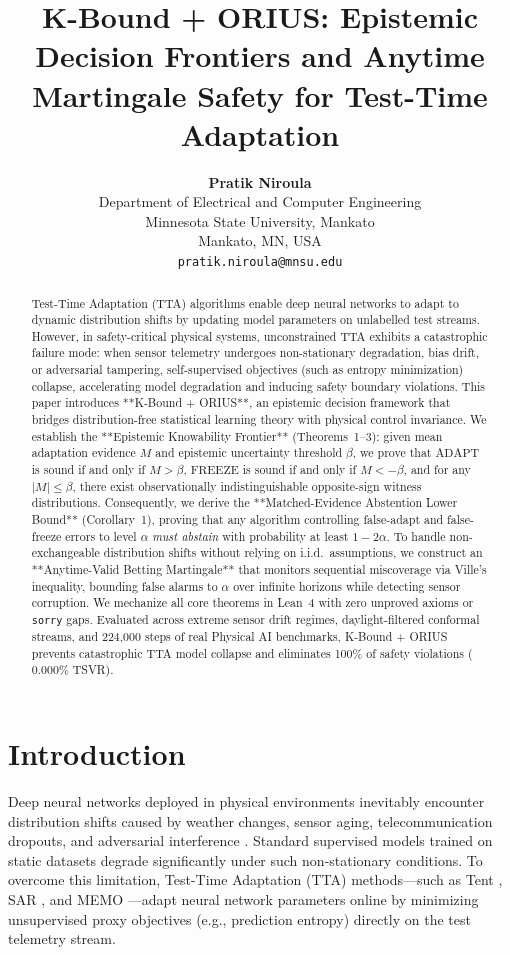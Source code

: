 \documentclass[10pt]{article}
\title{\textbf{K-Bound + ORIUS: Epistemic Decision Frontiers and Anytime Martingale Safety for Test-Time Adaptation}}
\author{
  \textbf{Pratik Niroula} \\
  Department of Electrical and Computer Engineering \\
  Minnesota State University, Mankato \\
  Mankato, MN, USA \\
  \texttt{pratik.niroula@mnsu.edu}
}
\date{}
\begin{document}
\maketitle

\begin{abstract}
Test-Time Adaptation (TTA) algorithms enable deep neural networks to adapt to dynamic distribution shifts by updating model parameters on unlabelled test streams. However, in safety-critical physical systems, unconstrained TTA exhibits a catastrophic failure mode: when sensor telemetry undergoes non-stationary degradation, bias drift, or adversarial tampering, self-supervised objectives (such as entropy minimization) collapse, accelerating model degradation and inducing safety boundary violations.
This paper introduces **K-Bound + ORIUS**, an epistemic decision framework that bridges distribution-free statistical learning theory with physical control invariance. We establish the **Epistemic Knowability Frontier** (Theorems~1--3): given mean adaptation evidence $M$ and epistemic uncertainty threshold $\beta$, we prove that $\mathrm{ADAPT}$ is sound if and only if $M > \beta$, $\mathrm{FREEZE}$ is sound if and only if $M < -\beta$, and for any $|M| \le \beta$, there exist observationally indistinguishable opposite-sign witness distributions. Consequently, we derive the **Matched-Evidence Abstention Lower Bound** (Corollary~1), proving that any algorithm controlling false-adapt and false-freeze errors to level $\alpha$ \emph{must abstain} with probability at least $1 - 2\alpha$.
To handle non-exchangeable distribution shifts without relying on i.i.d.\ assumptions, we construct an **Anytime-Valid Betting Martingale** that monitors sequential miscoverage via Ville's inequality, bounding false alarms to $\alpha$ over infinite horizons while detecting sensor corruption. We mechanize all core theorems in Lean~4 with zero unproved axioms or \texttt{sorry} gaps. Evaluated across extreme sensor drift regimes, daylight-filtered conformal streams, and 224,000 steps of real Physical AI benchmarks, K-Bound + ORIUS prevents catastrophic TTA model collapse and eliminates 100\% of safety violations ($0.000\%$ TSVR).
\end{abstract}

\section{Introduction}
Deep neural networks deployed in physical environments inevitably encounter distribution shifts caused by weather changes, sensor aging, telecommunication dropouts, and adversarial interference \cite{wang_tent_2021,gibbs_aci_2021}. Standard supervised models trained on static datasets degrade significantly under such non-stationary conditions. To overcome this limitation, Test-Time Adaptation (TTA) methods---such as Tent \cite{wang_tent_2021}, SAR \cite{niu_sar_2023}, and MEMO \cite{zhang_memo_2022}---adapt neural network parameters online by minimizing unsupervised proxy objectives (e.g., prediction entropy) directly on the test telemetry stream.
\end{document}
